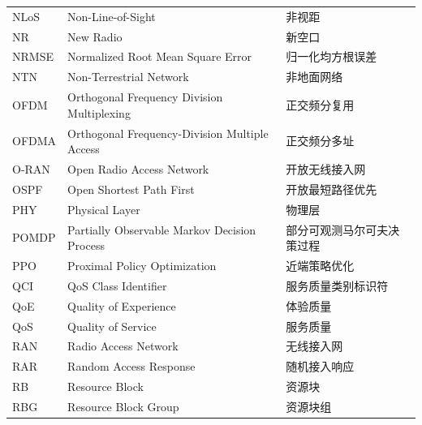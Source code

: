\begin{abbreviation}
\begin{longtable}{@{} p{} p{} p{} @{}}
  NLoS      & Non-Line-of-Sight                                               & 非视距                        \\
  NR        & New Radio                                                       & 新空口                        \\
  NRMSE     & Normalized Root Mean Square Error                              & 归一化均方根误差              \\
  NTN       & Non-Terrestrial Network                                        & 非地面网络                    \\
  OFDM      & Orthogonal Frequency Division Multiplexing                     & 正交频分复用                  \\
  OFDMA     & Orthogonal Frequency-Division Multiple Access                   & 正交频分多址                  \\
  O-RAN     & Open Radio Access Network                                       & 开放无线接入网                \\
  OSPF      & Open Shortest Path First                                       & 开放最短路径优先              \\
  PHY       & Physical Layer                                                  & 物理层                        \\
  POMDP     & Partially Observable Markov Decision Process                    & 部分可观测马尔可夫决策过程    \\
  PPO       & Proximal Policy Optimization                                   & 近端策略优化                  \\
  QCI       & QoS Class Identifier                                           & 服务质量类别标识符            \\
  QoE       & Quality of Experience                                          & 体验质量                      \\
  QoS       & Quality of Service                                             & 服务质量                      \\
  RAN       & Radio Access Network                                           & 无线接入网                    \\
  RAR       & Random Access Response                                         & 随机接入响应                  \\
  RB        & Resource Block                                                 & 资源块                        \\
  RBG       & Resource Block Group                                           & 资源块组                      \\

\end{longtable}
\end{abbreviation}
